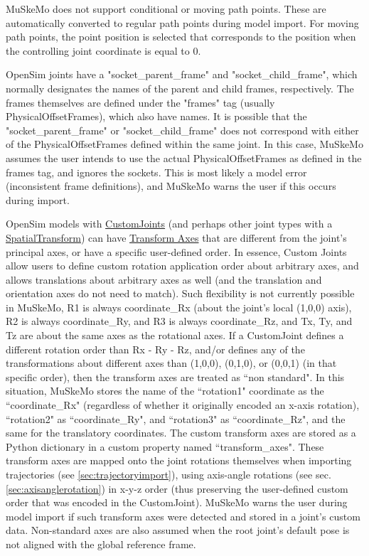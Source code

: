 \documentclass{article}
\begin{document}
MuSkeMo does not support conditional or moving path points. These are automatically converted to regular path points during model import. For moving path points, the point position is selected that corresponds to the position when the controlling joint coordinate is equal to 0.

OpenSim joints have a "socket\_parent\_frame" and "socket\_child\_frame", which normally designates the names of the parent and child frames, respectively. The frames themselves are defined under the "frames" tag (usually PhysicalOffsetFrames), which also have names. It is possible that the "socket\_parent\_frame" or "socket\_child\_frame" does not correspond with either of the PhysicalOffsetFrames defined within the same joint. In this case, MuSkeMo assumes the user intends to use the actual PhysicalOffsetFrames as defined in the frames tag, and ignores the sockets. This is most likely a model error (inconsistent frame definitions), and MuSkeMo warns the user if this occurs during import.

OpenSim models with \href{https://simtk.org/api_docs/opensim/api_docs/classOpenSim_1_1CustomJoint.html}{CustomJoints} (and perhaps other joint types with a \href{https://simtk.org/api_docs/opensim/api_docs/classOpenSim_1_1SpatialTransform.html}{SpatialTransform}) can have \href{https://simtk.org/api_docs/opensim/api_docs/classOpenSim_1_1TransformAxis.html}{Transform Axes} that are different from the joint's principal axes, or have a specific user-defined order. In essence, Custom Joints allow users to define custom rotation application order about arbitrary axes, and allows translations about arbitrary axes as well (and the translation and orientation axes do not need to match). Such flexibility is not currently possible in MuSkeMo, R1 is always coordinate\_Rx (about the joint's local (1,0,0) axis), R2 is always coordinate\_Ry, and R3 is always coordinate\_Rz, and Tx, Ty, and Tz are about the same axes as the rotational axes. If a CustomJoint defines a different rotation order than Rx - Ry - Rz, and/or defines any of the transformations about different axes than (1,0,0), (0,1,0), or (0,0,1) (in that specific order), then the transform axes are treated as ``non standard". In this situation, MuSkeMo stores the name of the ``rotation1" coordinate as the ``coordinate\_Rx" (regardless of whether it originally encoded an x-axis rotation), ``rotation2" as ``coordinate\_Ry", and ``rotation3" as ``coordinate\_Rz", and the same for the translatory coordinates. The custom transform axes are stored as a Python dictionary in a custom property named ``transform\_axes". These transform axes are mapped onto the joint rotations themselves when importing trajectories (see \ref{sec:trajectoryimport}), using axis-angle rotations (see sec. \ref{sec:axisanglerotation}) in x-y-z order (thus preserving the user-defined custom order that was encoded in the CustomJoint). MuSkeMo warns the user during model import if such transform axes were detected and stored in a joint's custom data.
Non-standard axes are also assumed when the root joint's default pose is not aligned with the global reference frame.
\end{document}
